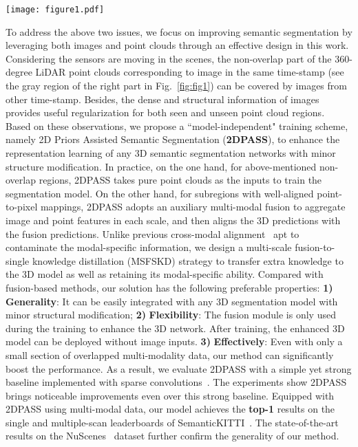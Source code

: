 \documentclass[runningheads]{llncs}
\begin{document}
	
	\begin{figure*}[t]
		\begin{centering}
			\texttt{[image: figure1.pdf]}
			\caption{\textbf{Limitation of fusion-based methods.} When the self-driving car only has front-cameras with limited perspective such as SemanticKITTI~\cite{behley2019semantickitti} dataset while the 360-degree LiDAR has a much larger sensing range, fusion-based methods that require strict alignment between camera and LiDAR can only identify a small proportion of the point cloud (see the red region).
			}
			\label{fig:fig1}
		\end{centering}	
	\end{figure*}
	
	
	To address the above two issues, we focus on improving semantic segmentation by leveraging both images and point clouds through an effective design in this work.
Considering the sensors are moving in the scenes, the non-overlap part of the 360-degree LiDAR point clouds corresponding to image in the same time-stamp (see the gray region of the right part in Fig.~\ref{fig:fig1}) can be covered by images from other time-stamp.
Besides, the dense and structural information of images provides useful regularization for both seen and unseen point cloud regions.
Based on these observations, we propose a ``model-independent" training scheme, namely {2D Priors Assisted Semantic Segmentation} (\textbf{2DPASS}), to enhance the representation learning of any 3D semantic segmentation networks with minor structure modification.
In practice, on the one hand, for above-mentioned non-overlap regions, 2DPASS takes pure point clouds as the inputs to train the segmentation model. 
On the other hand, for subregions with well-aligned point-to-pixel mappings, 2DPASS adopts an auxiliary multi-modal fusion to aggregate image and point features in each scale, and then aligns the 3D predictions with the  fusion predictions.
Unlike previous cross-modal alignment~\cite{jaritz2020xmuda} apt to contaminate the modal-specific information, we design a multi-scale fusion-to-single knowledge distillation (MSFSKD) strategy to transfer extra knowledge to the 3D model as well as retaining its modal-specific ability.
Compared with fusion-based methods, our solution has the following preferable properties:
	\textbf{1)} \textbf{Generality}: It can be easily integrated with any 3D segmentation model with minor structural modification;
	\textbf{2)} \textbf{Flexibility}: The fusion module is only used during the training to enhance the 3D network. After training, the enhanced 3D model can be deployed without image inputs.
	\textbf{3)} \textbf{Effectively}: Even with only a small section of overlapped  multi-modality data, our method can significantly boost the performance.
As a result, we evaluate 2DPASS with a simple yet strong baseline implemented with sparse convolutions~\cite{SparseConv}. The experiments show 2DPASS brings noticeable improvements even over this strong baseline. 
Equipped with 2DPASS using multi-modal data, our model achieves the \textbf{top-1} results on the single and multiple-scan leaderboards of SemanticKITTI~\cite{behley2019semantickitti}. 
The state-of-the-art results on the NuScenes~\cite{nuscenes} dataset further confirm the generality of our method.
\end{document}
